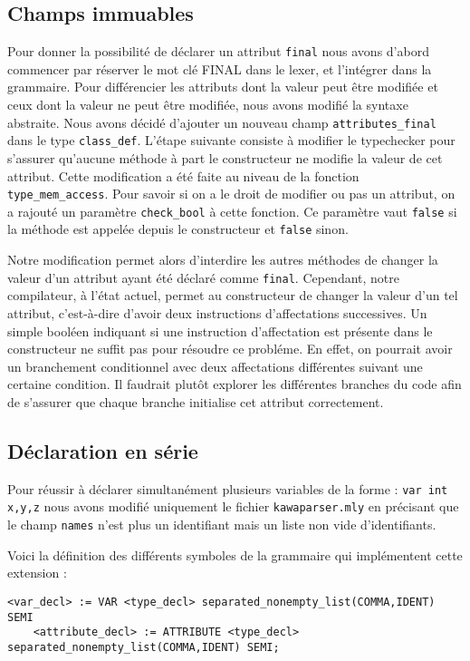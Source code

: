 \documentclass{article}
\begin{document}
\subsection{Champs immuables}
Pour donner la possibilité de déclarer un attribut \texttt{final} 
nous avons d'abord commencer par réserver le mot clé FINAL dans le lexer, et l'intégrer dans la grammaire.
Pour différencier les attributs dont la valeur peut être modifiée
et ceux dont la valeur ne peut être modifiée, nous avons modifié la syntaxe abstraite. 
Nous avons décidé d'ajouter un nouveau champ \texttt{attributes\_final} 
dans le type \texttt{class\_def}. L'étape suivante consiste à modifier le typechecker pour 
s'assurer qu'aucune méthode à part le constructeur ne modifie la valeur de cet attribut.
Cette modification a été faite au niveau de la fonction \texttt{type\_mem\_access}. Pour 
savoir si on a le droit de modifier ou pas un attribut, on a rajouté un paramètre \texttt{check\_bool}
à cette fonction. Ce paramètre vaut \texttt{false} si la méthode est appelée depuis le constructeur
et \texttt{false} sinon.

Notre modification permet alors d'interdire les autres méthodes de changer la valeur d'un attribut ayant été déclaré comme \texttt{final}.
Cependant, notre compilateur, à l'état actuel, permet au constructeur de changer la valeur d'un tel attribut, c'est-à-dire d'avoir 
deux instructions d'affectations successives. Un simple booléen indiquant si une instruction 
d'affectation est présente dans le constructeur ne suffit pas pour résoudre ce probléme.
En effet, on pourrait avoir un branchement conditionnel avec deux affectations différentes suivant 
une certaine condition. Il faudrait plutôt explorer les différentes branches du code afin 
de s'assurer que chaque branche initialise cet attribut correctement.

\subsection{Déclaration en série}
Pour réussir à déclarer simultanément plusieurs variables de la forme : 
\texttt{var int x,y,z} nous avons modifié uniquement le fichier 
\texttt{kawaparser.mly} en précisant que le champ \texttt{names} 
n'est plus un identifiant mais un liste non vide d'identifiants.

Voici la définition des différents symboles de la grammaire qui implémentent cette extension : 
\begin{lstlisting}[style=mystyle]
    <var_decl> := VAR <type_decl> separated_nonempty_list(COMMA,IDENT) SEMI
    <attribute_decl> := ATTRIBUTE <type_decl> separated_nonempty_list(COMMA,IDENT) SEMI;
\end{lstlisting}
\end{document}
